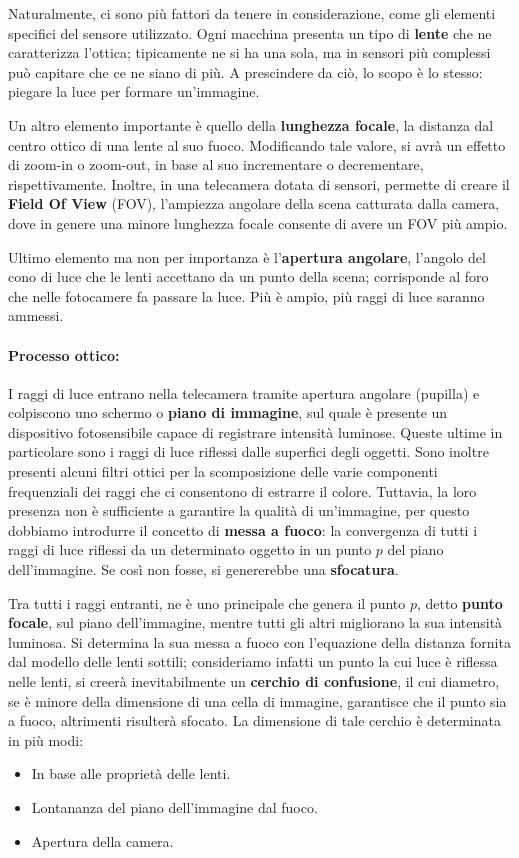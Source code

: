 \noindent Naturalmente, ci sono più fattori da tenere in considerazione, come gli elementi specifici del sensore utilizzato. Ogni macchina presenta un
tipo di \textbf{lente} che ne caratterizza l'ottica; tipicamente ne si ha una sola, ma in sensori più complessi può capitare che ce ne siano di più. A
prescindere da ciò, lo scopo è lo stesso: piegare la luce per formare un'immagine.\par
Un altro elemento importante è quello della \textbf{lunghezza focale}, la distanza dal centro ottico di una lente al suo fuoco. Modificando tale valore,
si avrà un effetto di zoom-in o zoom-out, in base al suo incrementare o decrementare, rispettivamente. Inoltre, in una telecamera dotata di sensori,
permette di creare il \textbf{Field Of View} (FOV), l'ampiezza angolare della scena catturata dalla camera, dove in genere una minore lunghezza focale
consente di avere un FOV più ampio.\par
Ultimo elemento ma non per importanza è l'\textbf{apertura angolare}, l'angolo del cono di luce che le lenti accettano da un punto della scena;
corrisponde al foro che nelle fotocamere fa passare la luce. Più è ampio, più raggi di luce saranno ammessi.

\paragraph{Processo ottico:} I raggi di luce entrano nella telecamera tramite apertura angolare (pupilla) e colpiscono uno schermo o \textbf{piano di
immagine}, sul quale è presente un dispositivo fotosensibile capace di registrare intensità luminose. Queste ultime in particolare sono i raggi di luce
riflessi dalle superfici degli oggetti. Sono inoltre presenti alcuni filtri ottici per la scomposizione delle varie componenti frequenziali dei raggi
che ci consentono di estrarre il colore. Tuttavia, la loro presenza non è sufficiente a garantire la qualità di un'immagine, per questo dobbiamo
introdurre il concetto di \textbf{messa a fuoco}: la convergenza di tutti i raggi di luce riflessi da un determinato oggetto in un punto $p$ del piano
dell'immagine. Se così non fosse, si genererebbe una \textbf{sfocatura}.\par
Tra tutti i raggi entranti, ne è uno principale che genera il punto $p$, detto \textbf{punto focale}, sul piano dell'immagine, mentre tutti gli altri
migliorano la sua intensità luminosa. Si determina la sua messa a fuoco con l'equazione della distanza fornita dal modello delle lenti sottili;
consideriamo infatti un punto la cui luce è riflessa nelle lenti, si creerà inevitabilmente un \textbf{cerchio di confusione}, il cui diametro, se è
minore della dimensione di una cella di immagine, garantisce che il punto sia a fuoco, altrimenti risulterà sfocato. La dimensione di tale cerchio è
determinata in più modi: \begin{itemize}
	\item In base alle proprietà delle lenti.
	\item Lontananza del piano dell'immagine dal fuoco.
	\item Apertura della camera.
\end{itemize}


